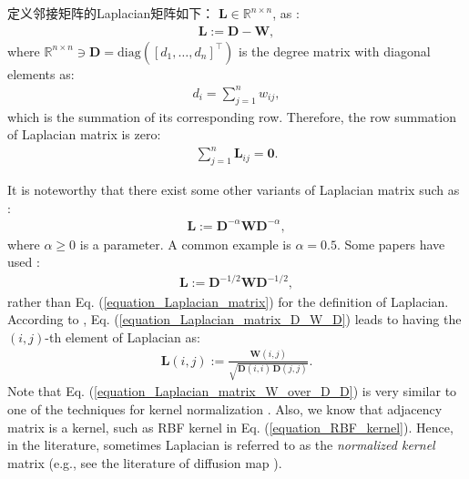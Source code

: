 \documentclass[lang=cn,10pt]{gorgeousnbook}
\numberwithin{equation}{section}%
\numberwithin{figure}{section}%
\begin{document}
定义邻接矩阵的Laplacian矩阵如下：
$\boldsymbol{L} \in \mathbb{R}^{n \times n}$, as \cite{merris1994laplacian}:
\begin{align}\label{equation_Laplacian_matrix}
\boldsymbol{L} := \boldsymbol{D} - \boldsymbol{W},
\end{align}
where $\mathbb{R}^{n \times n} \ni \boldsymbol{D} = \text{diag}([d_1, \dots, d_n]^\top)$ is the degree matrix with diagonal elements as:
\begin{align}\label{equation_degree_matrix}
d_i = \sum_{j=1}^n w_{ij},
\end{align}
which is the summation of its corresponding row. 
Therefore, the row summation of Laplacian matrix is zero:
\begin{align}\label{equation_Laplacian_row_sum}
\sum_{j=1}^n \boldsymbol{L}_{ij} = \boldsymbol{0}.
\end{align}

It is noteworthy that there exist some other variants of Laplacian matrix such as \cite{weiss1999segmentation,ng2001spectral}:
\begin{align}\label{equation_Laplacian_matrix_2}
\boldsymbol{L} := \boldsymbol{D}^{-\alpha} \boldsymbol{W} \boldsymbol{D}^{-\alpha},
\end{align}
where $\alpha \geq 0$ is a parameter. A common example is $\alpha=0.5$. 
Some papers have used \cite{weiss1999segmentation,ng2001spectral}:
\begin{align}\label{equation_Laplacian_matrix_D_W_D}
\boldsymbol{L} := \boldsymbol{D}^{-1/2} \boldsymbol{W} \boldsymbol{D}^{-1/2},
\end{align}
rather than Eq. (\ref{equation_Laplacian_matrix}) for the definition of Laplacian.  
According to \cite{weiss1999segmentation}, Eq. (\ref{equation_Laplacian_matrix_D_W_D}) leads to having the $(i,j)$-th element of Laplacian as:
\begin{align}\label{equation_Laplacian_matrix_W_over_D_D}
\boldsymbol{L}(i,j) := \frac{\boldsymbol{W}(i,j)}{\sqrt{\boldsymbol{D}(i,i)\, \boldsymbol{D}(j,j)}}.
\end{align}
Note that Eq. (\ref{equation_Laplacian_matrix_W_over_D_D}) is very similar to one of the techniques for kernel normalization \cite{ah2010normalized}. Also, we know that adjacency matrix is a kernel, such as RBF kernel in Eq. (\ref{equation_RBF_kernel}). Hence, in the literature, sometimes Laplacian is referred to as the \textit{normalized kernel} matrix (e.g., see the literature of diffusion map \cite{coifman2006diffusion,nadler2006diffusion2}). 
\end{document}
